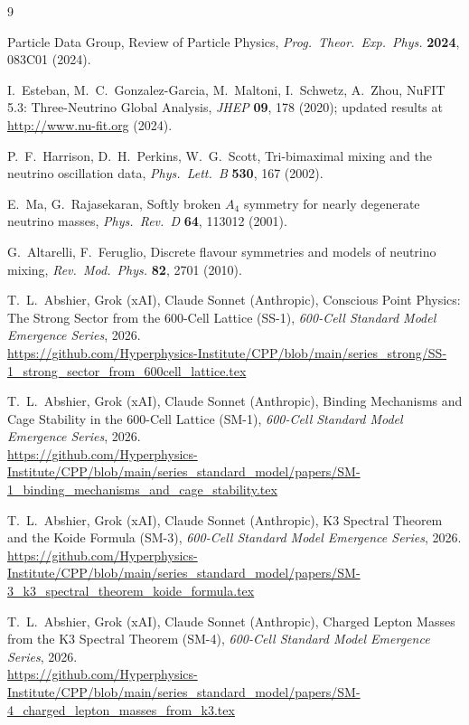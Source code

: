 \documentclass[11pt]{article}
\begin{document}
\begin{thebibliography}{9}

Particle Data Group,
Review of Particle Physics,
\textit{Prog.\ Theor.\ Exp.\ Phys.} \textbf{2024}, 083C01 (2024).

I.~Esteban, M.~C.~Gonzalez-Garcia, M.~Maltoni, I.~Schwetz, A.~Zhou,
NuFIT 5.3: Three-Neutrino Global Analysis,
\textit{JHEP} \textbf{09}, 178 (2020); updated results at\\
\url{http://www.nu-fit.org} (2024).

P.~F.~Harrison, D.~H.~Perkins, W.~G.~Scott,
Tri-bimaximal mixing and the neutrino oscillation data,
\textit{Phys.\ Lett.\ B} \textbf{530}, 167 (2002).

E.~Ma, G.~Rajasekaran,
Softly broken $A_4$ symmetry for nearly degenerate neutrino masses,
\textit{Phys.\ Rev.\ D} \textbf{64}, 113012 (2001).

G.~Altarelli, F.~Feruglio,
Discrete flavour symmetries and models of neutrino mixing,
\textit{Rev.\ Mod.\ Phys.} \textbf{82}, 2701 (2010).

T.~L.~Abshier, Grok (xAI), Claude Sonnet (Anthropic),
Conscious Point Physics: The Strong Sector from the 600-Cell Lattice (SS-1),
\textit{600-Cell Standard Model Emergence Series}, 2026.\\
\url{https://github.com/Hyperphysics-Institute/CPP/blob/main/series_strong/SS-1_strong_sector_from_600cell_lattice.tex}

T.~L.~Abshier, Grok (xAI), Claude Sonnet (Anthropic),
Binding Mechanisms and Cage Stability in the 600-Cell Lattice (SM-1),
\textit{600-Cell Standard Model Emergence Series}, 2026.\\
\url{https://github.com/Hyperphysics-Institute/CPP/blob/main/series_standard_model/papers/SM-1_binding_mechanisms_and_cage_stability.tex}

T.~L.~Abshier, Grok (xAI), Claude Sonnet (Anthropic),
K3 Spectral Theorem and the Koide Formula (SM-3),
\textit{600-Cell Standard Model Emergence Series}, 2026.\\
\url{https://github.com/Hyperphysics-Institute/CPP/blob/main/series_standard_model/papers/SM-3_k3_spectral_theorem_koide_formula.tex}

T.~L.~Abshier, Grok (xAI), Claude Sonnet (Anthropic),
Charged Lepton Masses from the K3 Spectral Theorem (SM-4),
\textit{600-Cell Standard Model Emergence Series}, 2026.\\
\url{https://github.com/Hyperphysics-Institute/CPP/blob/main/series_standard_model/papers/SM-4_charged_lepton_masses_from_k3.tex}

\end{thebibliography}
\end{document}
